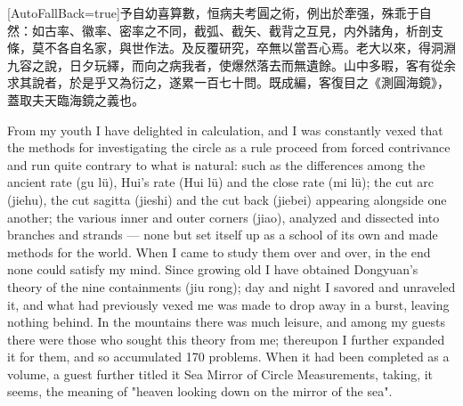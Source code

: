 \documentclass[11pt]{article}
\newcommand{\unitlabel}[1]{\marginpar{\raggedleft\tiny\color{gray}#1}}
\newenvironment{unitzh}{\par\CJKfontspec{Noto Serif CJK SC}[AutoFallBack=true]\large\linespread{1.25}\selectfont}{\par}
\newenvironment{uniten}{\par\small\color{black!85}}{\par\medskip}
\begin{document}
\begin{unitzh}\unitlabel{ceyuan-001.9}予自幼喜算數，恒病夫考圓之術，例出於牽强，殊乖于自然：如古率、徽率、密率之不同，截弧、截矢、截背之互見，内外諸角，析剖支條，莫不各自名家，與世作法。及反覆研究，卒無以當吾心焉。老大以來，得洞淵九容之說，日夕玩繹，而向之病我者，使爆然落去而無遺餘。山中多暇，客有從余求其說者，於是乎又為衍之，遂累一百七十問。既成編，客復目之《測圓海鏡》，蓋取夫天臨海鏡之義也。\end{unitzh}
\begin{uniten}From my youth I have delighted in calculation, and I was constantly vexed that the methods for investigating the circle as a rule proceed from forced contrivance and run quite contrary to what is natural: such as the differences among the ancient rate (gu lü), Hui's rate (Hui lü) and the close rate (mi lü); the cut arc (jiehu), the cut sagitta (jieshi) and the cut back (jiebei) appearing alongside one another; the various inner and outer corners (jiao), analyzed and dissected into branches and strands — none but set itself up as a school of its own and made methods for the world. When I came to study them over and over, in the end none could satisfy my mind. Since growing old I have obtained Dongyuan's theory of the nine containments (jiu rong); day and night I savored and unraveled it, and what had previously vexed me was made to drop away in a burst, leaving nothing behind. In the mountains there was much leisure, and among my guests there were those who sought this theory from me; thereupon I further expanded it for them, and so accumulated 170 problems. When it had been completed as a volume, a guest further titled it Sea Mirror of Circle Measurements, taking, it seems, the meaning of "heaven looking down on the mirror of the sea".\end{uniten}
\end{document}
